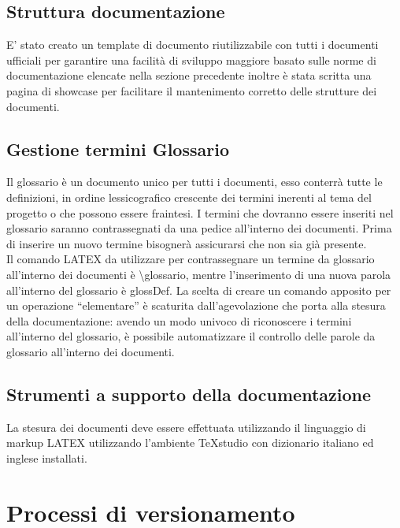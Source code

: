 \documentclass[NormeDiProgetto.tex]{subfiles}
\begin{document}
	\subsection{Struttura documentazione}
	E' stato creato un template di documento riutilizzabile con tutti i documenti ufficiali per garantire una facilità di sviluppo maggiore basato sulle norme di documentazione elencate nella sezione precedente inoltre è stata scritta una pagina di showcase per facilitare il mantenimento corretto delle strutture dei documenti.
	
	\subsection{Gestione termini Glossario}
	Il glossario è un documento unico per tutti i documenti, esso conterrà tutte le definizioni, in ordine lessicografico crescente dei termini inerenti al tema del progetto o che possono essere fraintesi. I termini che dovranno essere inseriti nel glossario saranno contrassegnati da una \citGloss{} pedice all’interno dei documenti. Prima di inserire un nuovo termine bisognerà assicurarsi che non sia già presente. \\
	Il comando LATEX da utilizzare per contrassegnare un termine da glossario all’interno dei documenti è \textbackslash glossario, mentre l’inserimento di una nuova parola all’interno del glossario è glossDef. %
	La scelta di creare un comando apposito per un operazione “elementare” è scaturita dall’agevolazione che porta alla stesura della documentazione: avendo un modo univoco di riconoscere i termini all’interno del glossario, è possibile automatizzare il controllo delle parole da glossario all’interno dei documenti.
	
	\subsection{Strumenti a supporto della documentazione} %
	La stesura dei documenti deve essere effettuata utilizzando il linguaggio di markup LATEX utilizzando l'ambiente TeXstudio con dizionario italiano ed inglese installati.
	
	
	\section{Processi di versionamento}
	
\end{document}
